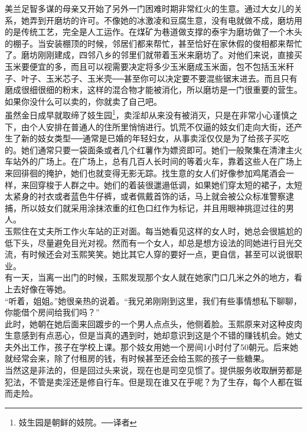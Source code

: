 \begin{multicols}{\theparacolNo}
美兰足智多谋的母亲又开始了另外一门困难时期非常红火的生意。通过大女儿的关系，她弄到开磨坊的许可。不像她的冰激凌和豆腐生意，没有电就做不成，磨坊用的是传统工艺，完全是人工运作。在煤矿为巷道做支撑的泰宇为磨坊做了一个木头的棚子。当安装棚顶的时候，邻居们都来帮忙，甚至恰好在家休假的俊相都来帮忙了。磨坊刚刚建成，四邻八乡的邻里们就带着玉米来磨坊了。对他们来说，直接买玉米要便宜的多，而且可以视需要决定将多少玉米磨成玉米面，包不包括玉米秆子、叶子、玉米芯子、玉米壳──甚至你可以决定要不要混些锯末进去。而且只有磨成很细很细的粉末，这样的混合物才能被消化，所以磨坊是一门很重要的营生。\\

如果你没什么可以卖的，你就卖了自己吧。\\

虽然金日成早就取缔了妓生园\footnote{妓生园是朝鲜的妓院。──译者}，卖淫却从来没有被消灭，只是在非常小心谨慎之下，由个人安排在普通人的住所里悄悄进行。饥荒不仅逼的妓女们走向大街，还产生了新的妓女类型──通常是已婚的年轻妇女，从事卖淫仅仅是为了给孩子买吃的。她们通常只要一袋面条或者几个红薯作为嫖资即可。她们一般聚集在清津主火车站外的广场上。在广场上，总有几百人长时间的等着火车，靠着这些人在广场上来回徘徊的掩护，她们也就变得无影无踪。找生意的女人们好像参加鸡尾酒会一样，来回穿梭于人群之中。她们的着装很邋遢低调，如果她们穿太短的裙子，太短太紧身的衬衣或者蓝色牛仔裤，或者佩戴首饰的话，马上就会被公众标准警察逮捕，所以妓女们就采用涂抹浓重的红色口红作为标记，并且用眼神挑逗过往的男人。\\

玉熙住在丈夫所工作火车站的正对面。每当她看见这样的女人时，她总会很尴尬的低下头，尽量避免目光对视。然而有一个女人，却总是想方设法的同她进行目光交流，有时候还会对玉熙笑笑。她比其它人穿的要好一点，更自信，甚至可以说很职业。\\

有一天，当离一出门的时候，玉熙发现那个女人就在她家门口几米之外的地方，看上去好像在等她。\\

“听着，姐姐。”她很亲热的说着。“我兄弟刚刚到这里，我们有些事情想私下聊聊，你能借个房间给我们吗？”\\

此时，她朝在她后面来回踱步的一个男人点点头，他侧着脸。玉熙原来对这种皮肉生意感到有点恶心，但是当真的遇到时，她却意识到这是个不错的赚钱机会。她丈夫外出工作，孩子在学校上课。那个妓女用她一个房间1小时付了50朝元。后来她就经常会来，除了付租房的钱，有时候甚至还会给玉熙的孩子一些糖果。\\

当然这是非法的，但是回过头来说，现在也是司空见惯了。提供服务收取酬劳都是犯法，不管是卖淫还是修自行车。但是现在谁又在乎呢？为了生存，每个人都在铤而走险。\\


\end{multicols}
